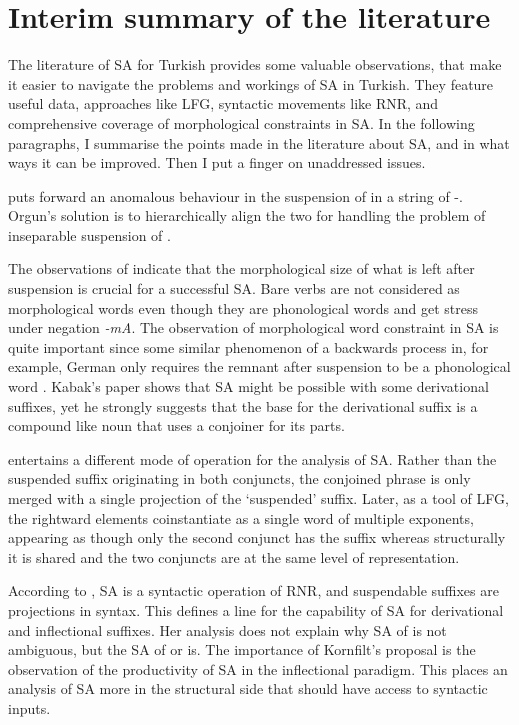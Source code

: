 \section{Interim summary of the literature}

The literature of SA for Turkish provides some valuable observations, that make it easier to navigate the problems and workings of SA in Turkish. They feature useful data, approaches like LFG, syntactic movements like RNR, and comprehensive coverage of morphological constraints in SA. In the following paragraphs, I summarise the points made in the literature about SA, and in what ways it can be improved. Then I put a finger on unaddressed issues.

\cite{orgun1995flat} puts forward an anomalous behaviour in the suspension of {\Poss} in a string of {\Pl-\Poss}. Orgun's solution is to hierarchically align the two for handling the problem of inseparable suspension of {\Poss}.

The observations of \cite{kabak2007turkish} indicate that the morphological size of what is left after suspension is crucial for a successful SA. Bare verbs are not considered as morphological words even though they are phonological words and get stress under negation \textit{-mA}. The observation of morphological word constraint in SA is quite important since some similar phenomenon of a backwards process in, for example, German only requires the remnant after suspension to be a phonological word \citep{smith2000word, pounder2006broken,kenesei2007semiwords}. Kabak's paper shows that SA might be possible with some derivational suffixes, yet he strongly suggests that the base for the derivational suffix is a compound like noun that uses a conjoiner for its parts.

\cite{broadwell2008turkish} entertains a different mode of operation for the analysis of SA. Rather than the suspended suffix originating in both conjuncts, the conjoined phrase is only merged with a single projection of the `suspended' suffix. Later, as a tool of LFG, the rightward elements coinstantiate as a single word of multiple exponents, appearing as though only the second conjunct has the suffix whereas structurally it is shared and the two conjuncts are at the same level of representation.

According to \cite{kornfilt1996some, kornfilt2012revisiting}, SA is a syntactic operation of RNR, and suspendable suffixes are projections in syntax. This defines a line for the capability of SA for derivational and inflectional suffixes. Her analysis does not explain why SA of {\Case} is not ambiguous, but the SA of {\Pl} or {\Poss} is. The importance of Kornfilt's proposal is the observation of the productivity of SA in the inflectional paradigm. This places an analysis of SA more in the structural side that should have access to syntactic inputs.


